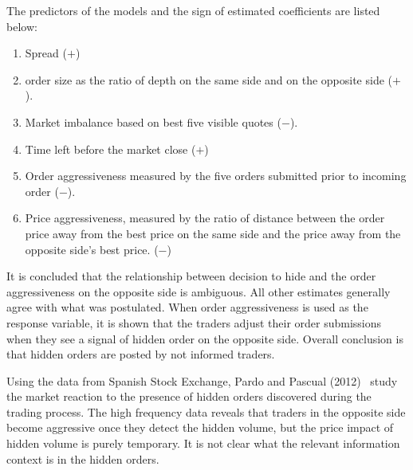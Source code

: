 The predictors of the models and the sign of estimated coefficients are listed below:
        \begin{enumerate}[--]
        \item Spread ($+$)
        \item order size as the ratio of depth on the same side and on the opposite side ($+$).
        \item Market imbalance based on best five visible quotes ($-$).
        \item Time left before the market close ($+$)
        \item Order aggressiveness measured by the five orders submitted prior to incoming order ($-$).
        \item Price aggressiveness, measured by the ratio of distance between the order price away from the best price on the same side and the price away from the opposite side's best price. ($-$)
        \end{enumerate}


It is concluded that the relationship  between decision to hide and the order aggressiveness on the opposite side is ambiguous. All other estimates generally agree with what was postulated. When order aggressiveness is used as the response variable, it is shown that the traders adjust their order submissions when they see a signal of hidden order on the opposite side. Overall conclusion is that hidden orders are posted by not informed traders. 


Using the data from Spanish Stock Exchange, Pardo and Pascual (2012)~\cite{pardopas} study the market reaction to the presence of hidden orders discovered during the trading process. The high frequency data reveals that traders in the opposite side become aggressive once they detect the hidden volume, but the price impact of hidden volume is purely temporary. It is not clear what the relevant information context is in the hidden orders.


